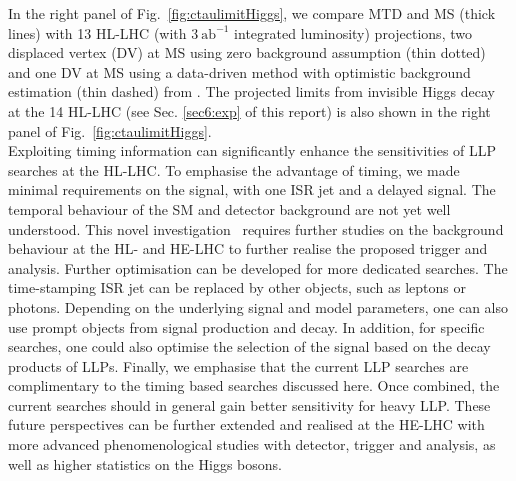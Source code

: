 In the right panel of Fig.~\ref{fig:ctaulimitHiggs}, we compare MTD and MS (thick lines) with 13 \UTeV  HL-LHC (with $3 ~\text{ab}^{-1}$ integrated luminosity) projections, two displaced vertex (DV) at 
MS using zero background assumption (thin dotted) and one DV at MS using a data-driven method with optimistic background estimation (thin dashed) from \cite{Coccaro:2016lnz}. 
The projected limits from invisible Higgs decay at the 14 \UTeV HL-LHC (see Sec. \ref{sec6:exp} of this report) is also shown in the right panel of Fig.~\ref{fig:ctaulimitHiggs}. \\

Exploiting timing information can significantly enhance 
the sensitivities of LLP searches at the HL-LHC. 
To emphasise the advantage of timing, we made minimal requirements on the signal, with one ISR jet
and a delayed signal. 
The temporal behaviour of the SM and detector background are not yet well understood. This novel investigation~\cite{Liu:2018wte} requires further studies on the background behaviour at the HL- and HE-LHC to further realise the proposed trigger and analysis.
Further optimisation can be developed for more dedicated searches. 
The time-stamping ISR jet can be replaced by other objects, such as leptons or photons. Depending on the underlying signal 
and model parameters, one can also use prompt objects from signal production and decay. In addition, for specific searches, 
one could also optimise the selection of the signal based on the decay products of LLPs. 
Finally, we emphasise that the current LLP searches are complimentary to the timing based searches discussed here. Once combined,
the current searches should in general gain better sensitivity for heavy LLP. These future perspectives can be further extended and realised at the HE-LHC with more advanced phenomenological studies with detector, trigger and analysis, as well as higher statistics on the Higgs bosons.



